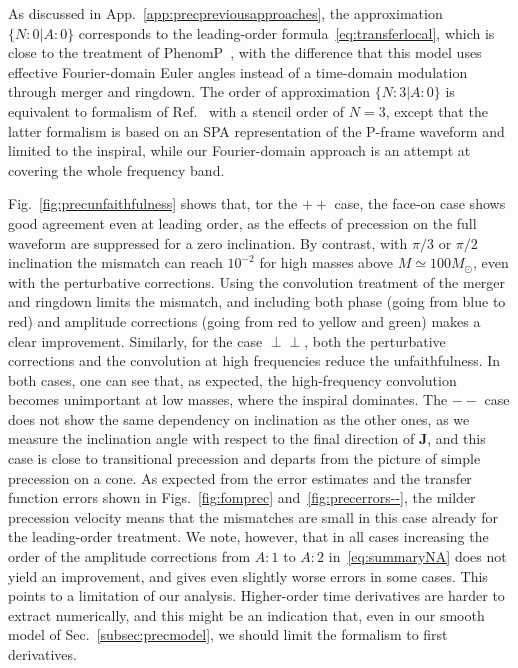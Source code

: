 \documentclass[aps,showpacs,twocolumn,
prd,superscriptaddress,nofootinbib]{revtex4-1}
\newcommand{\Msol}{M_{\odot}}
\begin{document}
As discussed in App.~\ref{app:precpreviousapproaches}, the approximation $\{N:0 | A:0\}$ corresponds to the leading-order formula~\eqref{eq:transferlocal}, which is close to the treatment of PhenomP~\cite{Hannam+13}, with the difference that this model uses effective Fourier-domain Euler angles instead of a time-domain modulation through merger and ringdown. The order of approximation $\{N:3 | A:0\}$ is equivalent to formalism of Ref.~\cite{KCY14} with a stencil order of $N=3$, except that the latter formalism is based on an SPA representation of the P-frame waveform and limited to the inspiral, while our Fourier-domain approach is an attempt at covering the whole frequency band.

Fig.~\ref{fig:precunfaithfulness} shows that, tor the $++$ case, the face-on case shows good agreement even at leading order, as the effects of precession on the full waveform are suppressed for a zero inclination. By contrast, with $\pi/3$ or $\pi/2$ inclination the mismatch can reach $10^{-2}$ for high masses above $M \simeq 100 \Msol$, even with the perturbative corrections. Using the convolution treatment of the merger and ringdown limits the mismatch, and including both phase (going from blue to red) and amplitude corrections (going from red to yellow and green) makes a clear improvement. Similarly, for the case $\perp\perp$, both the perturbative corrections and the convolution at high frequencies reduce the unfaithfulness. In both cases, one can see that, as expected, the high-frequency convolution becomes unimportant at low masses, where the inspiral dominates. The $--$ case does not show the same dependency on inclination as the other ones, as we measure the inclination angle with respect to the final direction of $\bm{J}$, and this case is close to transitional precession and departs from the picture of simple precession on a cone. As expected from the error estimates and the transfer function errors shown in Figs.~\ref{fig:fomprec} and~\ref{fig:precerrors--}, the milder precession velocity means that the mismatches are small in this case already for the leading-order treatment. We note, however, that in all cases increasing the order of the amplitude corrections from $A:1$ to $A:2$ in~\eqref{eq:summaryNA} does not yield an improvement, and gives even slightly worse errors in some cases. This points to a limitation of our analysis. Higher-order time derivatives are harder to extract numerically, and this might be an indication that, even in our smooth model of Sec.~\ref{subsec:precmodel}, we should limit the formalism to first derivatives.
\end{document}
